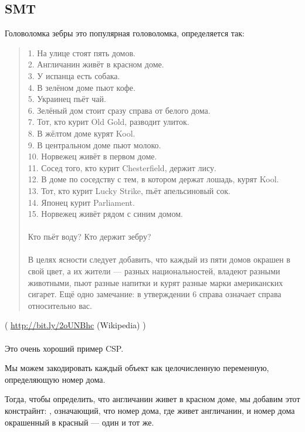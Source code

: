 \subsection{SMT}
\label{zebra_SMT}

Головоломка зебры это популярная головоломка, определяется так:

\begin{framed}
\begin{quotation}
1. На улице стоят пять домов.\\
2. Англичанин живёт в красном доме.\\
3. У испанца есть собака.\\
4. В зелёном доме пьют кофе.\\
5. Украинец пьёт чай.\\
6. Зелёный дом стоит сразу справа от белого дома.\\
7. Тот, кто курит Old Gold, разводит улиток.\\
8. В жёлтом доме курят Kool.\\
9. В центральном доме пьют молоко.\\
10. Норвежец живёт в первом доме.\\
11. Сосед того, кто курит Chesterfield, держит лису.\\
12. В доме по соседству с тем, в котором держат лошадь, курят Kool.\\
13. Тот, кто курит Lucky Strike, пьёт апельсиновый сок.\\
14. Японец курит Parliament.\\
15. Норвежец живёт рядом с синим домом.\\
\\
Кто пьёт воду? Кто держит зебру?\\
\\
В целях ясности следует добавить, что каждый из пяти домов окрашен в свой цвет, а их жители — разных национальностей, владеют разными животными, пьют разные напитки и курят разные марки американских сигарет. Ещё одно замечание: в утверждении 6 справа означает справа относительно вас.
\end{quotation}
\end{framed}
( \url{http://bit.ly/2oUNBhc} (Wikipedia) ) \\
\\
Это очень хороший пример \ac{CSP}.

Мы можем закодировать каждый объект как целочисленную переменную, определяющую номер дома.

Тогда, чтобы определить, что англичанин живет в красном доме, мы добавим этот констрайнт: , означающий, что номер дома, где живет англичанин, и номер дома окрашенный в красный --- один и тот же.

